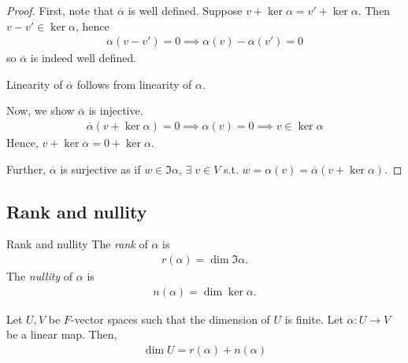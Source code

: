     \begin{proof}
        First, note that $\overline\alpha$ is well defined.
        Suppose $v + \ker \alpha = v' + \ker \alpha$.
        Then $v - v' \in \ker \alpha$, hence
        \begin{align*}
            \alpha(v - v') = 0 \implies \alpha(v) - \alpha(v') = 0
        \end{align*}
        so $\overline\alpha$ is indeed well defined.

        Linearity of $\overline \alpha$ follows from linearity of $\alpha$.

        Now, we show $\overline\alpha$ is injective.
        \begin{align*}
            \overline\alpha(v + \ker \alpha) = 0 \implies \alpha(v) = 0 \implies v \in \ker \alpha
        \end{align*}
        Hence, $v + \ker \alpha = 0 + \ker \alpha$.

        Further, $\overline\alpha$ is surjective as if $w \in \Im \alpha$, $\exists \; v \in V$ s.t. $w = \alpha(v) = \overline \alpha(v + \ker \alpha)$.
    \end{proof}

    \subsection{Rank and nullity}
    \begin{definition}{Rank and nullity}
        The \textit{rank} of $\alpha$ is
        \begin{align*}
            r(\alpha) = \dim\Im \alpha.
        \end{align*}
        The \textit{nullity} of $\alpha$ is
        \begin{align*}
            n(\alpha) = \dim\ker \alpha.
        \end{align*}
    \end{definition}

    \begin{theorem}
        Let $U, V$ be $F$-vector spaces such that the dimension of $U$ is finite.
        Let $\alpha \colon U \to V$ be a linear map.
        Then,
        \begin{align*}
            \dim U = r(\alpha) + n(\alpha)
        \end{align*}
    \end{theorem}

